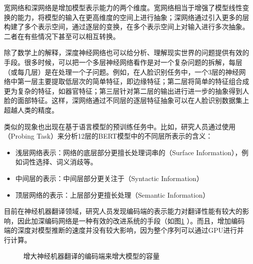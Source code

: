 \parinterval 宽网络和深网络是增加模型表示能力的两个维度。宽网络相当于增强了模型线性变换的能力，将模型的输入在更高维度的空间上进行抽象；深网络通过引入更多的层构建了多个表示空间，通过逐层的变换，在多个表示空间上对输入进行多次抽象。二者在有些情况下甚至可以相互转换。

\parinterval 除了数学上的解释，深度神经网络也可以给分析、理解现实世界的问题提供有效的手段。很多时候，可以把一个多层神经网络看作是对一个复杂问题的拆解，每层（或每几层）是在处理一个子问题。例如，在人脸识别任务中，一个3层的神经网络中第一层主要提取低层次的简单特征，即边缘特征；第二层将简单的特征组合成更为复杂的特征，如器官特征；第三层针对第二层的输出进行进一步的抽象得到人脸的面部特征。这样，深网络通过不同层的逐层特征抽象可以在人脸识别数据集上超越人类的精度\cite{DBLP:journals/corr/HeZRS15}。

\parinterval 类似的现象也出现在基于语言模型的预训练任务中。比如，研究人员通过使用{\small{}}（Probing Task）来分析12层的BERT模型中的不同层所表示的含义\cite{ethayarajh-2019-contextual,DBLP:conf/acl/JawaharSS19}：

\begin{itemize}
\vspace{0.5em}
\item 浅层网络表示：网络的底层部分更擅长处理词串的{\small{}}（Surface Information），例如词性选择、词义消歧等。
\vspace{0.5em}
\item 中间层的表示：中间层部分更关注于{\small{}}（Syntactic Information）
\vspace{0.5em}
\item 顶层网络的表示：上层部分更擅长处理{\small{}}（Semantic Information）
\vspace{0.5em}
\end{itemize}

\parinterval 目前在神经机器翻译领域，研究人员发现编码端的表示能力对翻译性能有较大的影响，因此加深编码网络是一种有效的改进系统的手段（如图\ref{fig:7-16} ）。而且，增加编码端的深度对模型推断的速度并没有较大影响，因为整个序列可以通过GPU进行并行计算。

\begin{figure}[htp]
\centering

\caption{增大神经机器翻译的编码端来增大模型的容量}
\label{fig:7-16}
\end{figure}

